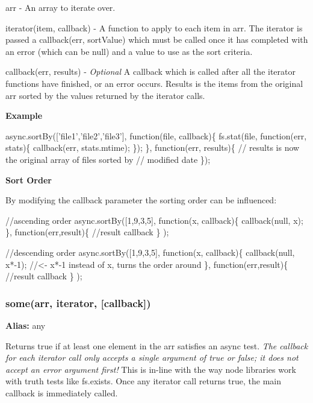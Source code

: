 \begin{DoxyItemize}
\item {\ttfamily arr} -\/ An array to iterate over.
\item {\ttfamily iterator(item, callback)} -\/ A function to apply to each item in {\ttfamily arr}. The iterator is passed a {\ttfamily callback(err, sort\+Value)} which must be called once it has completed with an error (which can be {\ttfamily null}) and a value to use as the sort criteria.
\item {\ttfamily callback(err, results)} -\/ {\itshape Optional} A callback which is called after all the {\ttfamily iterator} functions have finished, or an error occurs. Results is the items from the original {\ttfamily arr} sorted by the values returned by the {\ttfamily iterator} calls.
\end{DoxyItemize}

{\bfseries Example}


\begin{DoxyCode}
async.sortBy(['file1','file2','file3'], function(file, callback)\{
    fs.stat(file, function(err, stats)\{
        callback(err, stats.mtime);
    \});
\}, function(err, results)\{
    // results is now the original array of files sorted by
    // modified date
\});
\end{DoxyCode}


{\bfseries Sort Order}

By modifying the callback parameter the sorting order can be influenced\+:


\begin{DoxyCode}
//ascending order
async.sortBy([1,9,3,5], function(x, callback)\{
    callback(null, x);
\}, function(err,result)\{
    //result callback
\} );

//descending order
async.sortBy([1,9,3,5], function(x, callback)\{
    callback(null, x*-1);    //<- x*-1 instead of x, turns the order around
\}, function(err,result)\{
    //result callback
\} );
\end{DoxyCode}
 



\label{_some}%
 \subsubsection*{some(arr, iterator, \mbox{[}callback\mbox{]})}

{\bfseries Alias\+:} {\ttfamily any}

Returns {\ttfamily true} if at least one element in the {\ttfamily arr} satisfies an async test. {\itshape The callback for each iterator call only accepts a single argument of {\ttfamily true} or {\ttfamily false}; it does not accept an error argument first!} This is in-\/line with the way node libraries work with truth tests like {\ttfamily fs.\+exists}. Once any iterator call returns {\ttfamily true}, the main {\ttfamily callback} is immediately called.

